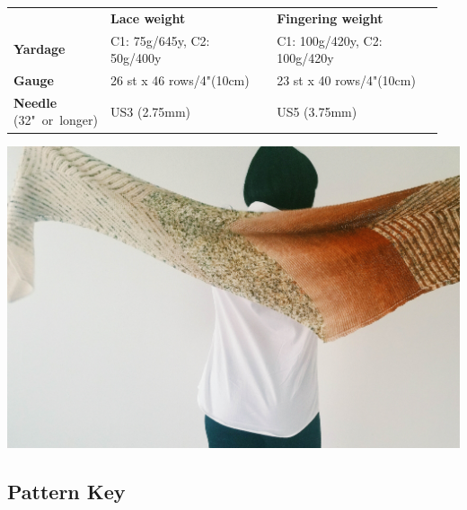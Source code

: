 \documentclass[12pt]{article}
\begin{document}
\begin{titlingpage}
\vfill

\begin{tabular}{ | C{0.15\linewidth}  C{0.4\linewidth}  C{0.4\linewidth} |}
\thickhline {}
{} 			&\textbf{Lace weight} 	& \textbf{Fingering weight} \\ \thickhline
\textbf{Yardage}	& C1: 75g/645y, C2: 50g/400y		& C1: 100g/420y, C2: 100g/420y \\
\textbf{Gauge}	& {26 st x 46 rows/4"(10cm)}	& {23 st x 40 rows/4"(10cm)} \\ 
\textbf{Needle} \mbox{(32" or longer)}	& US3 (2.75mm)		& US5 (3.75mm) \\ \hline
\end{tabular}

\vfill

\begin{center}
\includegraphics[width = 6.5in]{FW-spread-small} \end{center}
\end{titlingpage}

\subsection*{Pattern Key}
\end{document}
